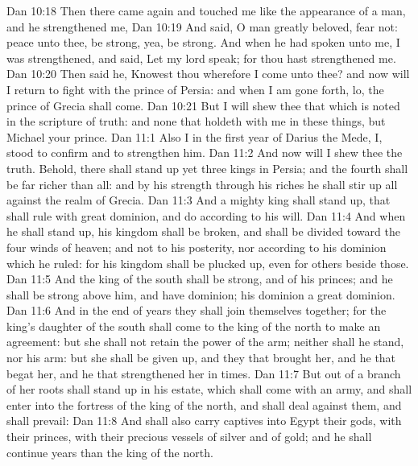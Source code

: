 \vs Dan 10:18 Then there came again and touched me  like the appearance of a man, and he strengthened me,
\vs Dan 10:19 And said, O man greatly beloved, fear not: peace  unto thee, be strong, yea, be strong. And when he had spoken unto me, I was strengthened, and said, Let my lord speak; for thou hast strengthened me.
\vs Dan 10:20 Then said he, Knowest thou wherefore I come unto thee? and now will I return to fight with the prince of Persia: and when I am gone forth, lo, the prince of Grecia shall come.
\vs Dan 10:21 But I will shew thee that which is noted in the scripture of truth: and  none that holdeth with me in these things, but Michael your prince.
\vs Dan 11:1 Also I in the first year of Darius the Mede,  I, stood to confirm and to strengthen him.
\vs Dan 11:2 And now will I shew thee the truth. Behold, there shall stand up yet three kings in Persia; and the fourth shall be far richer than  all: and by his strength through his riches he shall stir up all against the realm of Grecia.
\vs Dan 11:3 And a mighty king shall stand up, that shall rule with great dominion, and do according to his will.
\vs Dan 11:4 And when he shall stand up, his kingdom shall be broken, and shall be divided toward the four winds of heaven; and not to his posterity, nor according to his dominion which he ruled: for his kingdom shall be plucked up, even for others beside those.
\vs Dan 11:5 And the king of the south shall be strong, and  of his princes; and he shall be strong above him, and have dominion; his dominion  a great dominion.
\vs Dan 11:6 And in the end of years they shall join themselves together; for the king's daughter of the south shall come to the king of the north to make an agreement: but she shall not retain the power of the arm; neither shall he stand, nor his arm: but she shall be given up, and they that brought her, and he that begat her, and he that strengthened her in  times.
\vs Dan 11:7 But out of a branch of her roots shall  stand up in his estate, which shall come with an army, and shall enter into the fortress of the king of the north, and shall deal against them, and shall prevail:
\vs Dan 11:8 And shall also carry captives into Egypt their gods, with their princes,  with their precious vessels of silver and of gold; and he shall continue  years than the king of the north.
